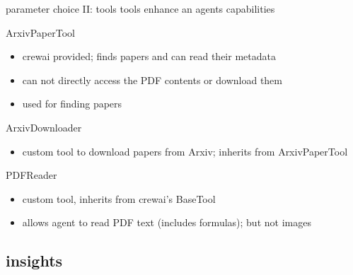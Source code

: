 \documentclass[t,
10pt,
handout, %
]{beamer}
\numberwithin{equation}{section}
\begin{document}
	\begin{frame}[c]{parameter choice II: tools}
		tools enhance an agents capabilities
		\pause
		\begin{block}{ArxivPaperTool}
			\begin{itemize}
				\item crewai provided; finds papers and can read their metadata
				\item can not directly access the PDF contents or download them
				\item used for finding papers
				\end{itemize}
		\end{block}
		\pause
		\begin{block}{ArxivDownloader}
			\begin{itemize}
				\item custom tool to download papers from Arxiv; inherits from ArxivPaperTool
			\end{itemize}
		\end{block}
		\pause
		\begin{alertblock}{PDFReader}
			\begin{itemize}
				\item custom tool, inherits from crewai's BaseTool
				\item allows agent to read PDF text (includes formulas); but not images
			\end{itemize}
		\end{alertblock}
	\end{frame}
	
	\subsection{insights}
	
\end{document}
